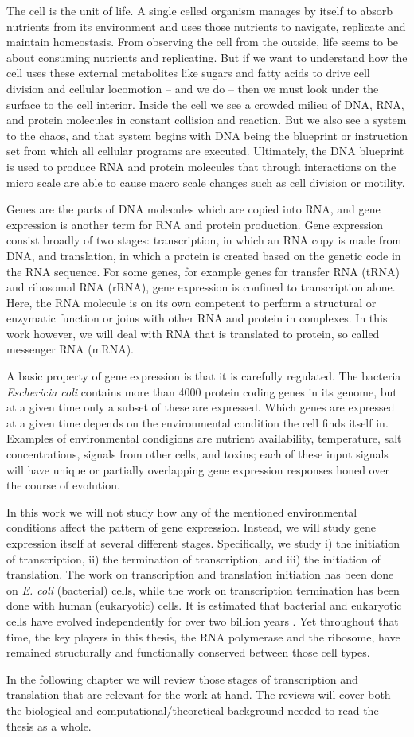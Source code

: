 %

The cell is the unit of life. A single celled organism manages by itself to
absorb nutrients from its environment and uses those nutrients to navigate,
replicate and maintain homeostasis. From observing the cell from the outside,
life seems to be about consuming nutrients and replicating. But if we want to
understand how the cell uses these external metabolites like sugars and fatty
acids to drive cell division and cellular locomotion -- and we do -- then we
must look under the surface to the cell interior. Inside the cell we see a
crowded milieu of DNA, RNA, and protein molecules in constant collision and
reaction. But we also see a system to the chaos, and that system begins with
DNA being the blueprint or instruction set from which all cellular programs are
executed. Ultimately, the DNA blueprint is used to produce RNA and protein
molecules that through interactions on the micro scale are able to cause macro
scale changes such as cell division or motility.

Genes are the parts of DNA molecules which are copied into RNA, and gene
expression is another term for RNA and protein production. Gene expression
consist broadly of two stages: transcription, in which an RNA copy is made from
DNA, and translation, in which a protein is created based on the genetic code
in the RNA sequence. For some genes, for example genes for transfer RNA (tRNA)
and ribosomal RNA (rRNA), gene expression is confined to transcription alone.
Here, the RNA molecule is on its own competent to perform a structural or
enzymatic function or joins with other RNA and protein in complexes. In this
work however, we will deal with RNA that is translated to protein, so called
messenger RNA (mRNA).

A basic property of gene expression is that it is carefully regulated. The
bacteria \textit{Eschericia coli} contains more than 4000 protein coding genes
in its genome, but at a given time only a subset of these are expressed. Which
genes are expressed at a given time depends on the environmental condition the
cell finds itself in. Examples of environmental condigions are nutrient
availability, temperature, salt concentrations, signals from other cells, and
toxins; each of these input signals will have unique or partially overlapping
gene expression responses honed over the course of evolution.

In this work we will not study how any of the mentioned environmental
conditions affect the pattern of gene expression. Instead, we will study gene
expression itself at several different stages. Specifically, we study i) the
initiation of transcription, ii) the termination of transcription, and iii) the
initiation of translation. The work on transcription and translation initiation
has been done on \textit{E. coli} (bacterial) cells, while the work on
transcription termination has been done with human (eukaryotic) cells. It is
estimated that bacterial and eukaryotic cells have evolved independently for
over two billion years \cite{vellai_origin_1999}. Yet throughout that time, the
key players in this thesis, the RNA polymerase and the ribosome, have remained
structurally and functionally conserved between those cell types.

In the following chapter we will review those stages of transcription and
translation that are relevant for the work at hand. The reviews will cover both
the biological and computational/theoretical background needed to read the
thesis as a whole.

